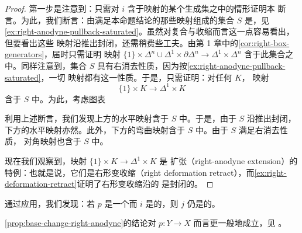 \begin{proof}
第一步是注意到：只需对 $i$ 含于\trRightAnodyne{}映射的某个生成集之中的情形证明本
断言。为此，我们断言：由满足本命题结论的那些\trRightAnodyne{}映射组成的集合 $S$
是\trSaturated{}，见\cref{ex:right-anodyne-pullback-saturated}。虽然对复合与收缩而言这一点容易看出，但要看出这些
映射沿推出封闭，还需稍费些工夫。由第 1 章中的\cref{cor:right-box-generators}，届时只需证明
映射
$\{1\} \times \Delta^n \cup \Delta^1 \times \partial\Delta^n \to \Delta^1 \times \Delta^n$
含于此集合之中。同样注意到，集合 $S$ 具有右消去性质，因为按\cref{ex:right-anodyne-pullback-saturated}，一切%
\trRightAnodyne{}映射都有这一性质。于是，只需证明：对任何\trSimplicialSet{} $K$，
映射
\[
\{1\} \times K \to \Delta^1 \times K
\]
含于 $S$ 中。为此，考虑图表
\begin{center}
\end{center}
利用上述断言，我们发现上方的水平映射含于 $S$ 中。于是，由于 $S$ 沿推出封闭，
下方的水平映射亦然。此外，下方的弯曲映射含于 $S$ 中。由于 $S$ 满足右消去性质，
对角映射也含于 $S$ 中。

现在我们观察到，映射 $\{1\} \times K \to \Delta^1 \times K$ 是\trRightAnodyne{}%
扩张（right-anodyne extension）的特例：也就是说，它们是右形变收缩（right
deformation retract），而\cref{ex:right-deformation-retract}证明了右形变收缩沿\trLeftFibration{}的%
\trPullback{}是封闭的。
\end{proof}

\begin{remark}\label{rem:base-change-left-anodyne}
通过应用\trOppositeFunctor{}，我们发现：若 $p$ 是一个\trRightFibration{}而 $i$
是\trLeftAnodyne{}的，则 $j$ 仍是\trLeftAnodyne{}的。
\end{remark}

\begin{remark}\label{rem:base-change-cocartesian}
\cref{prop:base-change-right-anodyne}的结论对\trCocartesianFibration{}%
$p\colon Y \to X$ 而言更一般地成立，见 \cite[Proposition 4.1.2.15]{Lur09}。
\end{remark}


